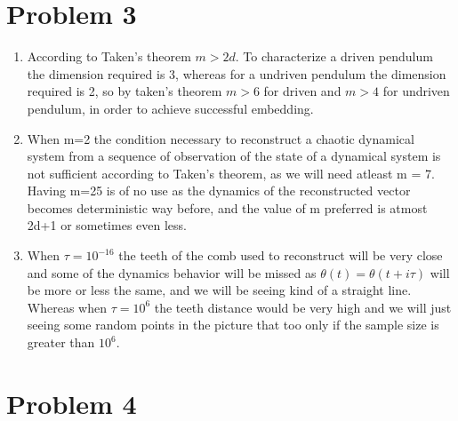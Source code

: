 \documentclass{article}
\begin{document}
\begin{enumerate}[label=(\alph*)]
\begin{minipage}{\linewidth}
{\begin{table}[H]
\begin{tabular}{|c|c|}
    \hline
\end{tabular}
\end{table}
}
\end{minipage}
\end{enumerate}

\section*{Problem 3}
\begin{enumerate}[label=(\alph*)]
\item
According to Taken's theorem $m > 2d$. To characterize a driven pendulum the dimension required is 3, whereas for a undriven pendulum the dimension required is 2, so by taken's theorem $m > 6$ for driven and $m > 4$ for undriven pendulum, in order to achieve successful embedding. 
\item
When m=2 the condition necessary to reconstruct a chaotic dynamical system from a sequence of observation of the state of a dynamical system is not sufficient according to Taken's theorem, as we will need atleast m = 7. Having m=25 is of no use as the dynamics of the reconstructed vector becomes deterministic way before, and the value of m preferred is atmost 2d+1 or sometimes even less.
\item
When $\tau = 10^{-16}$ the teeth of the comb used to reconstruct will be very close and some of the dynamics behavior will be missed as $\theta(t) = \theta(t+i\tau)$ will be more or less the same, and we will be seeing kind of a straight line. Whereas when $\tau = 10^{6}$ the teeth distance would be very high  and we will just seeing some random points in the picture that too only if the sample size is greater than $10^{6}$.
\end{enumerate}
\newpage
\section*{Problem 4}
\end{document}
